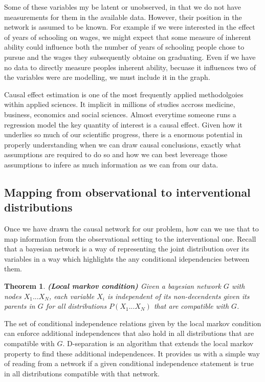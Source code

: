 \documentclass[11pt,a4paper,oneside]{book}
\newtheorem{theorem}{Theorem}
\begin{document}
Some of these variables my be latent or unobserved, in that we do not have measurements for them in the available data. However, their position in the network is assumed to be known. For example if we were interested in the effect of years of schooling on wages, we might expect that some measure of inherent ability could influence both the number of years of schooling people chose to pursue and the wages they subsequently obtaine on graduating. Even if we have no data to directly measure peoples inherent ability, becuase it influences two of the variables were are modelling, we must include it in the graph.

Causal effect estimation is one of the most frequently applied methodolgoies within applied sciences. It implicit in millions of studies accross medicine, business, economics and social sciences. Almost everytime someone runs a regression model the key quantity of interest is a causal effect. Given how it underlies so much of our scientific progress, there is a enormous potential in properly understanding when we can draw causal conclusions, exactly what assumptions are required to do so and how we can best levereage those assumptions to infere as much information as we can from our data. 

\subsection*{Mapping from observational to interventional distributions}
Once we have drawn the causal network for our problem, how can we use that to map information from the observational setting to the interventional one. Recall that a bayesian network is a way of representing the joint distribution over its variables in a way which highlights the any conditional idependencies between them. 

\begin{theorem}
\textbf{(Local markov condition)} Given a bayesian network $G$ with nodes $X_{1}...X_{N}$, each variable $X_{i}$ is independent of its non-decendents given its parents in $G$ for all distributions $P(X_{1}...X_{N})$ that are compatible with $G$.
\end{theorem}

The set of conditional independence relations given by the local markov condition can enforce additional independences that also hold in all distributions that are compatible with $G$. D-separation is an algorithm that extends the local markov property to find these additional independences. It provides us with a simple way of reading from a network if a given conditional independence statement is true in all distributions compatible with that network.
\end{document}
